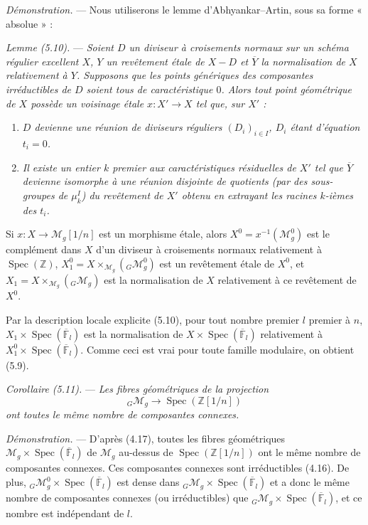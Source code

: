 \documentclass[10pt]{article}
\newcommand{\Spec}{\operatorname{Spec}}
\begin{document}
\noindent\emph{Démonstration.} --- Nous utiliserons le lemme d'Abhyankar--Artin, sous sa forme « absolue » :

\medskip
\noindent\emph{Lemme (5.10).} --- \emph{Soient $D$ un diviseur à croisements normaux sur un schéma régulier excellent $X$, $Y$ un revêtement étale de $X-D$ et $\overline Y$ la normalisation de $X$ relativement à $Y$. Supposons que les points génériques des composantes irréductibles de $D$ soient tous de caractéristique $0$. Alors tout point géométrique de $X$ possède un voisinage étale $x:X'\to X$ tel que, sur $X'$ :}
\begin{enumerate}[label=(\roman*)]
\item \emph{$D$ devienne une réunion de diviseurs réguliers $(D_i)_{i\in I}$, $D_i$ étant d'équation $t_i=0$.}
\item \emph{Il existe un entier $k$ premier aux caractéristiques résiduelles de $X'$ tel que $\overline Y$ devienne isomorphe à une réunion disjointe de quotients (par des sous-groupes de $\mu_k^I$) du revêtement de $X'$ obtenu en extrayant les racines $k$-ièmes des $t_i$.}
\end{enumerate}

Si $x:X\to\mathcal M_g[1/n]$ est un morphisme étale, alors $X^0=x^{-1}(\mathcal M_g^0)$ est le complément dans $X$ d'un diviseur à croisements normaux relativement à $\Spec(\mathbb Z)$, $X_1^0=X\times_{\mathcal M_g}({}_G\mathcal M_g^0)$ est un revêtement étale de $X^0$, et $X_1=X\times_{\mathcal M_g}({}_G\mathcal M_g)$ est la normalisation de $X$ relativement à ce revêtement de $X^0$.

Par la description locale explicite (5.10), pour tout nombre premier $l$ premier à $n$, $X_1\times\Spec(\overline{\mathbb F}_l)$ est la normalisation de $X\times\Spec(\overline{\mathbb F}_l)$ relativement à $X_1^0\times\Spec(\overline{\mathbb F}_l)$. Comme ceci est vrai pour toute famille modulaire, on obtient (5.9).

\medskip
\noindent\emph{Corollaire (5.11).} --- \emph{Les fibres géométriques de la projection}
\[
{}_G\mathcal M_g\longrightarrow \Spec(\mathbb Z[1/n])
\]
\emph{ont toutes le même nombre de composantes connexes.}

\noindent\emph{Démonstration.} --- D'après (4.17), toutes les fibres géométriques $\mathcal M_g\times\Spec(\overline{\mathbb F}_l)$ de $\mathcal M_g$ au-dessus de $\Spec(\mathbb Z[1/n])$ ont le même nombre de composantes connexes. Ces composantes connexes sont irréductibles (4.16). De plus, ${}_G\mathcal M_g^0\times\Spec(\overline{\mathbb F}_l)$ est dense dans ${}_G\mathcal M_g\times\Spec(\overline{\mathbb F}_l)$ et a donc le même nombre de composantes connexes (ou irréductibles) que ${}_G\mathcal M_g\times\Spec(\overline{\mathbb F}_l)$, et ce nombre est indépendant de $l$.
\end{document}
